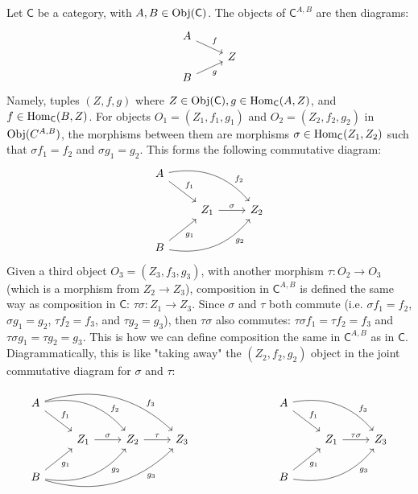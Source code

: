 \begin{solution}
	Let $\mathsf{C}$ be a category, with $A,B\in\mathrm{Obj}(\mathsf{C})$. The objects of $\mathsf{C}^{A,B}$ are
	then diagrams:
	\[\begin{tikzcd}[row sep=tiny]
	A \arrow[dr, "f"]  &   \\
	& Z \\
	B \arrow[ur, "g"'] & 
	\end{tikzcd}\]
	Namely, tuples $(Z,f,g)$ where $Z\in\mathrm{Obj}(\mathsf{C}),g\in\mathrm{Hom}_\mathsf{C}(A,Z)$, and
	$f\in\mathrm{Hom}_\mathsf{C}(B,Z)$. For objects $O_1=(Z_1,f_1,g_1)$ and $O_2=(Z_2,f_2,g_2)$ in
	$\mathrm{Obj}(C^{A,B})$, the morphisms between them are morphisms
	$\sigma\in\mathrm{Hom}_\mathsf{C}(Z_1,Z_2)$ such that $\sigma f_1=f_2$ and $\sigma g_1=g_2$.
	This forms the following commutative diagram:
	\[\begin{tikzcd}
	A \arrow[dr, "f_1"] \arrow[drr, bend left, "f_2" near end]    &                               \\
	& Z_1 \arrow[r, "\sigma"] & Z_2 \\
	B \arrow[ur, "g_1"'] \arrow[urr, bend right, "g_2"' near end] &
	\end{tikzcd}\]
	Given a third object $O_3=(Z_3,f_3,g_3)$, with another morphism $\tau:O_2\to
	O_3$ (which is a morphism from $Z_2\to Z_3$), composition in $\mathsf{C}^{A,B}$ is
	defined the same way as composition in $\mathsf{C}$: $\tau\sigma:Z_1\to Z_3$. Since
	$\sigma$ and $\tau$ both commute (i.e.  $\sigma f_1=f_2$, $\sigma g_1=g_2$,
	$\tau f_2=f_3$, and $\tau g_2=g_3$), then $\tau\sigma$ also commutes: $\tau
	\sigma f_1=\tau f_2=f_3$ and $\tau \sigma g_1= \tau g_2 = g_3$. This is how we
	can define composition the same in $\mathsf{C}^{A,B}$ as in $\mathsf{C}$. Diagrammatically, this
	is like "taking away" the $(Z_2,f_2,g_2)$ object in the joint commutative
	diagram for $\sigma$ and $\tau$:
	\[
	\begin{tikzcd}
	A \arrow[dr, "f_1"] \arrow[drr, bend left, "f_2" near end] \arrow[drrr, bend left, "f_3" near end] & & \\
	& Z_1 \arrow[r, "\sigma"] & Z_2 \arrow[r, "\tau"] & Z_3 \\
	B \arrow[ur, "g_1"'] \arrow[urr, bend right, "g_2"' near end] \arrow[urrr, bend right, "g_3"' near end] & &
	\end{tikzcd}
	\hspace{1in}
	\begin{tikzcd}
	A \arrow[dr, "f_1"] \arrow[drr, bend left, "f_3" near end]    &                               \\
	& Z_1 \arrow[r, "\tau\sigma"] & Z_3 \\
	B \arrow[ur, "g_1"'] \arrow[urr, bend right, "g_3"' near end] &
	\end{tikzcd}
	\]


\end{solution}

